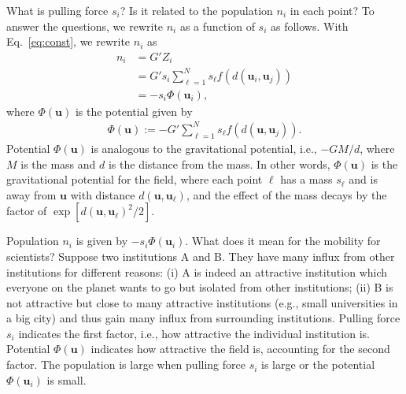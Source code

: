 \documentclass[12pt]{article} %
\def\vec#1{{\bm #1}}
\begin{document}
What is pulling force $s_i$? Is it related to the population $n_i$ in each point?
To answer the questions, we rewrite $n_i$ as a function of $s_i$ as follows. 
With Eq.~\eqref{eq:const}, we rewrite $n_i$ as 
\begin{align}
    n_i &= G' Z_i \nonumber \\
        &= G' s_i \sum_{\ell=1}^N s_\ell f\left(d\left(\vec{u}_i,\vec{u}_j\right)\right) \nonumber \\ 
        &= - s_i \Phi(\vec{u}_i), \label{eq:flow_gravity_model_2} %
\end{align}
where $\Phi(\vec{u})$ is the potential given by 
\begin{align}
    \Phi(\vec{u}):=-G' \sum_{\ell=1}^N s_\ell f\left(d\left(\vec{u},\vec{u}_j\right)\right).
\end{align}
Potential $\Phi(\vec{u})$ is analogous to the gravitational potential, i.e., $-GM/d$, where $M$ is the mass and $d$ is the distance from the mass.
In other words,  $\Phi(\vec{u})$ is the gravitational potential for the field, where 
each point $\ell$ has a mass $s_{\ell}$ and is away from $\vec{u}$ with distance $d(\vec{u},\vec{u}_\ell)$, and the effect of the mass decays by the factor of $\exp\left[d(\vec{u},\vec{u}_\ell) ^2 /2\right]$.

Population $n_i$ is given by $-s_i\Phi(\vec{u}_i)$. What does it mean for the mobility for scientists?
Suppose two institutions A and B. They have many influx from other institutions for different reasons:
(i) A is indeed an attractive institution which everyone on the planet wants to go but isolated from other institutions;
(ii) B is not attractive but close to many attractive institutions (e.g., small universities in a big city) and thus gain many influx from surrounding institutions.
Pulling force $s_i$ indicates the first factor, i.e., how attractive the individual institution is. 
Potential $\Phi(\vec{u})$ indicates how attractive the field is, accounting for the second factor.
The population is large when pulling force $s_i$ is large or the potential $\Phi(\vec{u}_i)$ is small. 
\end{document}
